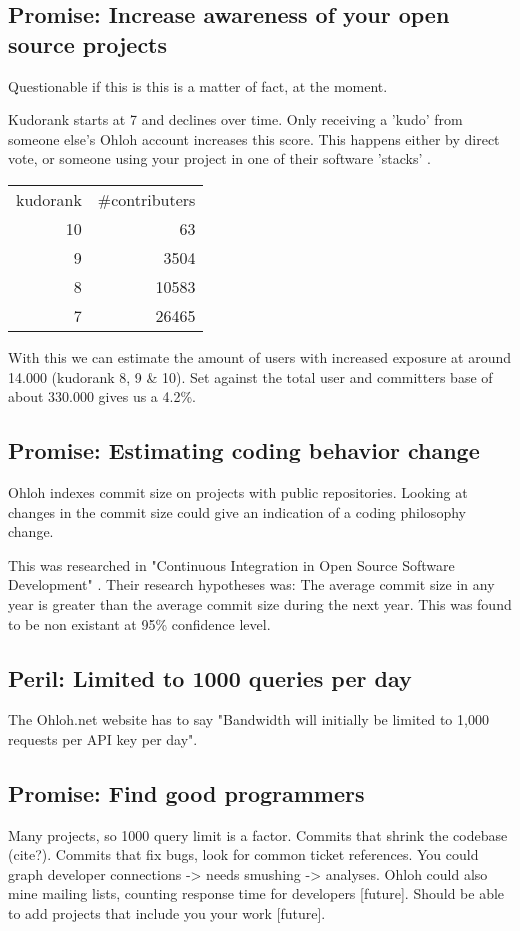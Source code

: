 \documentclass{sig-alternate}
\begin{document}
\subsection{Promise: Increase awareness of your open source projects}
Questionable if this is this is a matter of fact, at the moment. 

Kudorank starts at 7 and declines over time. Only receiving a 'kudo' from someone else's Ohloh account increases this score. This happens either by direct vote, or someone using your project in one of their software 'stacks' \cite{ohloh-kudos}. 

\begin{tabular}{ r r }
  kudorank & \#contributers \\
  10 &    63 \\
  9  &  3504 \\
  8  & 10583 \\
  7  & 26465 \\
\end{tabular}

With this we can estimate the amount of users with increased exposure at around 14.000 (kudorank 8, 9 \& 10). Set against the total user and committers base of about 330.000 gives us a 4.2\%.


\subsection{Promise: Estimating coding behavior change}
Ohloh indexes commit size on projects with public repositories. Looking at changes in the commit size could give an indication of a coding philosophy change.

This was researched in "Continuous Integration in 
Open Source Software Development" \cite{Deshpande:2008p4463}. Their research hypotheses was: The average commit size in any year is greater than the average commit size during the next year. This was found to be non existant at 95\% confidence level. 


\subsection{Peril: Limited to 1000 queries per day}
The Ohloh.net website has to say "Bandwidth will initially be limited to 1,000 requests per API key per day".


\subsection{Promise: Find good programmers}
Many projects, so 1000 query limit is a factor. Commits that shrink the codebase (cite?). Commits that fix bugs, look for common ticket references. You could graph developer connections -> needs smushing ->  analyses. Ohloh could also mine mailing lists, counting response time for developers [future]. Should be able to add projects that include you your work [future].
\end{document}
